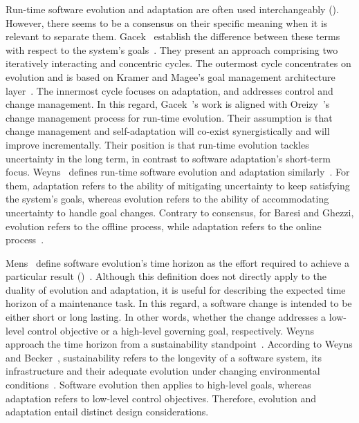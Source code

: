 Run-time software evolution and adaptation are often used interchangeably (). However, there seems to be a consensus on their specific meaning when it is relevant to separate them. Gacek~\etal{} establish the difference between these terms with respect to the system's goals~\cite{gacek-2008-friends}. They present an approach comprising two iteratively interacting and concentric cycles. The outermost cycle concentrates on evolution and is based on Kramer and Magee's goal management architecture layer~\cite{kramer-2007-self}. The innermost cycle focuses on adaptation, and addresses control and change management. In this regard, Gacek~\etal{}'s work is aligned with Oreizy~\etal{}'s change management process for run-time evolution. Their assumption is that change management and self-adaptation will co-exist synergistically and will improve incrementally. Their position is that run-time evolution tackles uncertainty in the long term, in contrast to software adaptation's short-term focus. Weyns~\etal{} defines run-time software evolution and adaptation similarly~\cite{weyns-2015-design}. For them, adaptation refers to the ability of mitigating uncertainty to keep satisfying the system's goals, whereas evolution refers to the ability of accommodating uncertainty to handle goal changes. Contrary to consensus, for Baresi and Ghezzi, evolution refers to the offline process, while adaptation refers to the online process~\cite{baresi-2010-disappearing}.

Mens~\etal{} define software evolution's time horizon as the effort required to achieve a particular result ()~\cite{mens-2005-challenges}. Although this definition does not directly apply to the duality of evolution and adaptation, it is useful for describing the expected time horizon of a maintenance task. In this regard, a software change is intended to be either short or long lasting. In other words, whether the change addresses a low-level control objective or a high-level governing goal, respectively. Weyns~\etal{} approach the time horizon from a sustainability standpoint~\cite{weyns-2015-design}. According to Weyns and Becker~\etal{}, sustainability refers to the longevity of a software system, its infrastructure and their adequate evolution under changing environmental conditions~\cite{becker-2015-karlskrona}. Software evolution then applies to high-level goals, whereas adaptation refers to low-level control objectives. Therefore, evolution and adaptation entail distinct design considerations.

